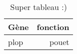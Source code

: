 \begin{table}
\begin{center}
\begin{tabular}{ l r }
	Gène & fonction \\
	\hline
	plop & pouet\\
\end{tabular}
\caption{Super tableau :)}
\label{tab:tab1}
\end{center}
\end{table}
